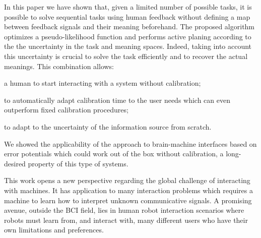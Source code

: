 In this paper we have shown that, given a limited number of possible tasks, it is possible to solve sequential tasks using human feedback without defining a map between feedback signals and their meaning beforehand. The proposed algorithm optimizes a pseudo-likelihood function and performs active planing according to the the uncertainty in the task and meaning spaces. Indeed, taking into account this uncertainty is crucial to solve the task efficiently and to recover the actual meanings. This combination allows: 
\begin{inparaenum}[a)]
\item a human to start interacting with a system without calibration;
\item to automatically adapt calibration time to the user needs which can even outperform fixed calibration procedures; 
\item to adapt to the uncertainty of the information source from scratch.
\end{inparaenum}
We showed the applicability of the approach to brain-machine interfaces based on error potentials which could work out of the box without calibration, a long-desired property of this type of systems. 

This work opens a new perspective regarding the global challenge of interacting with machines. It has application to many interaction problems which requires a machine to learn how to interpret unknown communicative signals. A promising avenue, outside the BCI field, lies in human robot interaction scenarios where robots must learn from, and interact with, many different users who have their own limitations and preferences.


